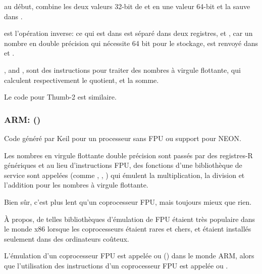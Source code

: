  au début, combine les deux valeurs 32-bit de  et 
en une valeur 64-bit et la sauve dans .

 est l'opération inverse: ce qui est dans  est séparé
dans deux registres,  et , car un nombre en double précision qui
nécessite 64 bit pour le stockage, est renvoyé dans  et .

,  and , 
sont des instructions pour traiter des nombres à virgule flottante, qui calculent
respectivement le \gls{quotient},  et la somme.

Le code pour Thumb-2 est similaire.

\subsubsection{ARM: \OptimizingKeilVI (\ThumbMode)}



Code généré par Keil pour un processeur sans FPU ou support pour NEON.

Les nombres en virgule flottante double précision sont passés par des registres-R
génériques et au lieu d'instructions FPU, des fonctions d'une bibliothèque de service
sont appelées (comme , , )
qui émulent la multiplication, la division et l'addition pour les nombres à virgule
flottante.

Bien sûr, c'est plus lent qu'un coprocesseur FPU, mais toujours mieux que rien.

À propos, de telles bibliothèques d'émulation de FPU étaient très populaire dans
le monde x86 lorsque les coprocesseurs étaient rares et chers, et étaient installés
seulement dans des ordinateurs coûteux.


L'émulation d'un coprocesseur FPU est appelée  ou  ()
dans le monde ARM, alors que l'utilisation des instructions d'un coprocesseur FPU
est appelée  ou .

\iffalse

